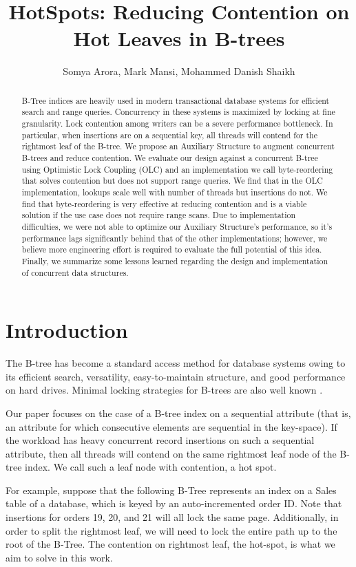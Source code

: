 \documentclass[twocolumn]{article}
\title{HotSpots: Reducing Contention on Hot Leaves in B-trees}
\date{}
\author{Somya Arora, Mark Mansi, Mohammed Danish Shaikh}
\begin{document}
\maketitle

\begin{abstract}
B-Tree indices are heavily used in modern transactional database systems for
efficient search and range queries. Concurrency in these systems is maximized
by locking at fine granularity. Lock contention among writers can be a severe
performance bottleneck. In particular, when insertions are on a sequential key,
all threads will contend for the rightmost leaf of the B-tree. We propose an
Auxiliary Structure to augment concurrent B-trees and reduce contention. We
evaluate our design against a concurrent B-tree using Optimistic Lock Coupling
(OLC) \cite{art} and an implementation we call byte-reordering that solves contention
but does not support range queries. We find that in the OLC implementation,
lookups scale well with number of threads but insertions do not. We find that
byte-reordering is very effective at reducing contention and is a viable
solution if the use case does not require range scans. Due to implementation
difficulties, we were not able to optimize our Auxiliary Structure’s
performance, so it’s performance lags significantly behind that of the other
implementations; however, we believe more engineering effort is required to
evaluate the full potential of this idea. Finally, we summarize some lessons
learned regarding the design and implementation of concurrent data structures.
\end{abstract}

\section{Introduction}
The B-tree has become a standard access method for database systems owing to
its efficient search, versatility, easy-to-maintain structure, and good
performance on hard drives. Minimal locking strategies for B-trees are also
well known \cite{blink}.

Our paper focuses on the case of a B-tree index on a sequential attribute (that
is, an attribute for which consecutive elements are sequential in the
key-space). If the workload has heavy concurrent record insertions on such a
sequential attribute, then all threads will contend on the same rightmost leaf
node of the B-tree index.  We call such a leaf node with contention, a hot
spot.

For example, suppose that the following B-Tree represents an index on a Sales
table of a database, which is keyed by an auto-incremented order ID. Note that
insertions for orders 19, 20, and 21 will all lock the same page. Additionally,
in order to split the rightmost leaf, we will need to lock the entire path up
to the root of the B-Tree. The contention on rightmost leaf, the hot-spot, is
what we aim to solve in this work.
\end{document}
